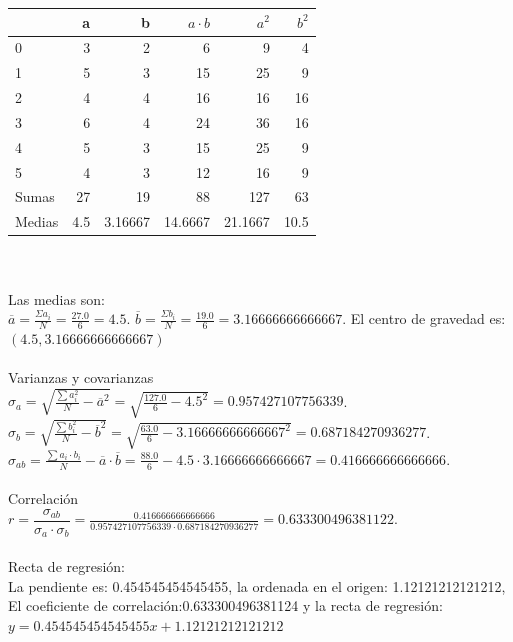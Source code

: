 \documentclass[addpoints,spanish, 12pt,a4paper]{exam}
\begin{document}
\begin{questions}
\begin{solution}
\begin{tabular}{lrrrrr}
\hline
        &    a &        b &   $a\cdot b$ &    $a^2$ &   $b^2$ \\
\hline
 0      &  3   &  2       &       6      &   9      &     4   \\
 1      &  5   &  3       &      15      &  25      &     9   \\
 2      &  4   &  4       &      16      &  16      &    16   \\
 3      &  6   &  4       &      24      &  36      &    16   \\
 4      &  5   &  3       &      15      &  25      &     9   \\
 5      &  4   &  3       &      12      &  16      &     9   \\
 Sumas  & 27   & 19       &      88      & 127      &    63   \\
 Medias &  4.5 &  3.16667 &      14.6667 &  21.1667 &    10.5 \\
\hline
\end{tabular}
\\ \\ Las medias son: \\$\overline{a}=\frac{\Sigma{a_i}}{N}=\frac{27.0}{6}=4.5$. $\overline{b}=\frac{\Sigma{b_i}}{N}=\frac{19.0}{6}=3.16666666666667$.  El centro de gravedad es: $(4.5,3.16666666666667)$ \\ \\ Varianzas y covarianzas\\ $\sigma_a=\sqrt{\frac{\sum{a_i^2}}{N}-\overline{a}^2}=\sqrt{\frac{127.0}{6}-4.5^2}=0.957427107756339$.\\ $\sigma_b=\sqrt{\frac{\sum{b_i^2}}{N}-\overline{b}^2}=\sqrt{\frac{63.0}{6}-3.16666666666667^2}=0.687184270936277$.\\ $\sigma_{ab}=\frac{\sum{a_i \cdot b_i}}{N}-\overline{a}\cdot \overline{b}=\frac{88.0}{6}-4.5\cdot 3.16666666666667=0.416666666666666$. \\ \\ Correlación\\ $r=\dfrac{\sigma_{ab}}{\sigma_a \cdot \sigma_b}=\frac{0.416666666666666}{0.957427107756339\cdot 0.687184270936277}=0.633300496381122$. \\ \\ Recta de regresión: \\ La pendiente es: 0.454545454545455, la ordenada en el origen: 1.12121212121212, El coeficiente de correlación:0.633300496381124 y la recta de regresión: $y = 0.454545454545455 x + 1.12121212121212$
\end{solution}


\end{questions}
\end{document}
